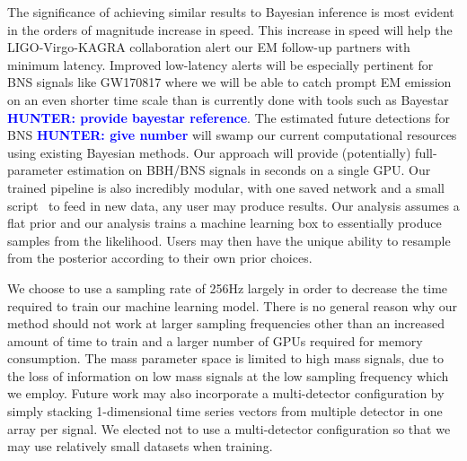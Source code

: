 \documentclass[%
showpacs,
 amsmath,amssymb,
 aps,
 twocolumn,
 prl,
 reprint,
floatfix,
]{revtex4-1}
\newcommand{\hunter}[1]{\textbf{\textcolor{blue}{HUNTER: #1}}}
\begin{document}
%
%
The significance of achieving similar results
to Bayesian inference is most evident in the orders of magnitude increase in speed. This increase in speed will help the
LIGO-Virgo-KAGRA collaboration alert our \ac{EM} follow-up partners with
minimum latency. Improved low-latency alerts will be especially 
pertinent for \ac{BNS} signals like GW170817 where we will be able 
to catch prompt \ac{EM} emission on an even shorter time scale than 
is currently done with tools such as Bayestar \hunter{provide bayestar 
reference}. The estimated future detections for \ac{BNS} \hunter{ 
give number} will swamp our current computational resources using 
existing Bayesian methods. Our approach will provide (potentially) 
full-parameter estimation on \ac{BBH}/{\ac{BNS}} signals in seconds 
on a single GPU. Our trained pipeline is also incredibly modular, with 
one saved network and a small script~ to feed in new data, 
any user may produce results. Our analysis assumes a flat prior and our 
analysis trains a machine learning box to essentially produce samples 
from the likelihood. Users may then have the unique ability to 
resample from the posterior according to their own prior choices.  

%
%
We choose to use a sampling rate of 256Hz largely in order to 
decrease the time required to train our machine learning model. 
There is no general reason why our method 
should not work at larger sampling frequencies other than an 
increased amount of time to train and a larger 
number of GPUs required for memory consumption. The mass parameter space is limited 
to high mass signals, due to the loss of information on low mass 
signals at the low sampling frequency which we employ. Future work 
may also incorporate a multi-detector configuration by simply stacking 
1-dimensional time series vectors from multiple detector in one array 
per signal. We elected not to use a multi-detector configuration so 
that we may use relatively small datasets when training.
\end{document}
